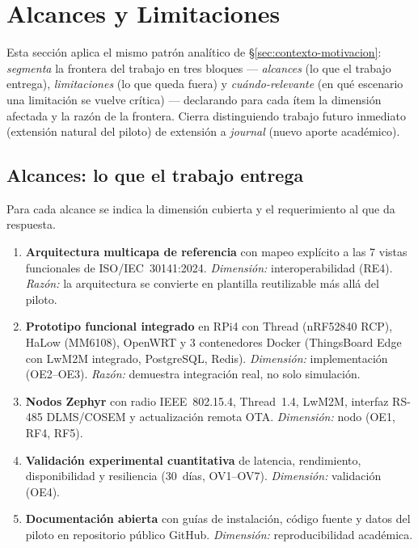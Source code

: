 \section{Alcances y Limitaciones}
\label{sec:alcances-limitaciones}

Esta sección aplica el mismo patrón analítico de §\ref{sec:contexto-motivacion}: \emph{segmenta} la frontera del trabajo en tres bloques --- \emph{alcances} (lo que el trabajo entrega), \emph{limitaciones} (lo que queda fuera) y \emph{cuándo-relevante} (en qué escenario una limitación se vuelve crítica) --- declarando para cada ítem la dimensión afectada y la razón de la frontera. Cierra distinguiendo trabajo futuro inmediato (extensión natural del piloto) de extensión a \emph{journal} (nuevo aporte académico).

\subsection{Alcances: lo que el trabajo entrega}

Para cada alcance se indica la dimensión cubierta y el requerimiento al que da respuesta.

\begin{enumerate}
    \item \textbf{Arquitectura multicapa de referencia} con mapeo explícito a las 7 vistas funcionales de ISO/IEC~30141:2024. \emph{Dimensión:} interoperabilidad (RE4). \emph{Razón:} la arquitectura se convierte en plantilla reutilizable más allá del piloto.
    \item \textbf{Prototipo funcional integrado} en RPi4 con Thread (nRF52840 RCP), HaLow (MM6108), OpenWRT y 3 contenedores Docker (ThingsBoard Edge con LwM2M integrado, PostgreSQL, Redis). \emph{Dimensión:} implementación (OE2--OE3). \emph{Razón:} demuestra integración real, no solo simulación.
    \item \textbf{Nodos Zephyr} con radio IEEE~802.15.4, Thread~1.4, LwM2M, interfaz RS-485 DLMS/COSEM y actualización remota OTA. \emph{Dimensión:} nodo (OE1, RF4, RF5).
    \item \textbf{Validación experimental cuantitativa} de latencia, rendimiento, disponibilidad y resiliencia (30~días, OV1--OV7). \emph{Dimensión:} validación (OE4).
    \item \textbf{Documentación abierta} con guías de instalación, código fuente y datos del piloto en repositorio público GitHub. \emph{Dimensión:} reproducibilidad académica.
\end{enumerate}

